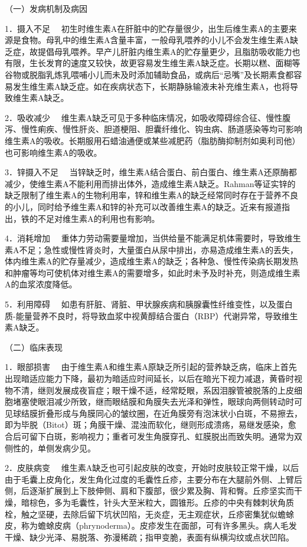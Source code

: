 （一）发病机制及病因

{1．摄入不足}
　初生时维生素A在肝脏中的贮存量很少，出生后维生素A的主要来源是食物。母乳中的维生素A含量丰富，一般母乳喂养的小儿不会发生维生素A缺乏症，故提倡母乳喂养。早产儿肝脏内维生素A的贮存量更少，且脂肪吸收能力也有限，生长发育的速度又较快，故更容易发生维生素A缺乏症。长期以糕、面糊等谷物或脱脂乳炼乳喂哺小儿而未及时添加辅助食品，或病后“忌嘴”及长期素食都容易发生维生素A缺乏症。如在疾病状态下，长期静脉输液未补充维生素A，也将导致维生素A缺乏。

{2．吸收减少}
　维生素A缺乏可见于多种临床情况，如吸收障碍综合征、慢性腹泻、慢性痢疾、慢性肝炎、胆道梗阻、胆囊纤维化、钩虫病、肠道感染等均可影响维生素A的吸收。长期服用石蜡油通便或某些减肥药（脂肪酶抑制剂如奥利司他）也可影响维生素A的吸收。

{3．锌摄入不足}
　当锌缺乏时，维生素A结合蛋白、前白蛋白、维生素A还原酶都减少，使维生素A不能利用而排出体外，造成维生素A缺乏。Rahman等证实锌的缺乏限制了维生素A的生物利用率，锌和维生素A的缺乏经常同时存在于营养不良的小儿，同时给予维生素A和锌的补充可以改善维生素A的缺乏。近来有报道指出，铁的不足对维生素A的利用也有影响。

{4．消耗增加}
　重体力劳动需要量增加，当供给量不能满足机体需要时，导致维生素A不足；急性或慢性肾炎时，大量蛋白从尿中排出，亦易造成维生素A的丢失，体内维生素A的贮存量减少，造成维生素A的缺乏；各种急、慢性传染病长期发热和肿瘤等均可使机体对维生素A的需要增多，如此时未予及时补充，则造成维生素A的血浆浓度降低。

{5．利用障碍}
　如患有肝脏、肾脏、甲状腺疾病和胰腺囊性纤维变性，以及蛋白质-能量营养不良时，将导致血浆中视黄醇结合蛋白（RBP）代谢异常，导致维生素A缺乏。

（二）临床表现

{1．眼部损害}
　由于维生素A和维生素A原缺乏所引起的营养缺乏病，临床上首先出现暗适应能力下降，最初为暗适应时间延长，以后在暗光下视力减退，黄昏时视物不清，继则发展成夜盲症；眼干燥不适，经常眨眼，系因泪腺管被脱落的上皮细胞堵塞使眼泪减少所致，继而眼结膜和角膜失去光泽和弹性，眼球向两侧转动时可见球结膜折叠形成与角膜同心的皱纹圈，在近角膜旁有泡沫状小白斑，不易擦去，即为毕脱（Bitot）斑；角膜干燥、混浊而软化，继则形成溃疡，易继发感染，愈合后可留下白斑，影响视力；重者可发生角膜穿孔、虹膜脱出而致失明。通常为双侧性的，单侧发病少见。

{2．皮肤病变}
　维生素A缺乏也可引起皮肤的改变，开始时皮肤较正常干燥，以后由于毛囊上皮角化，发生角化过度的毛囊性丘疹，主要分布在大腿前外侧、上臂后侧，后逐渐扩展到上下肢伸侧、肩和下腹部，很少累及胸、背和臀。丘疹坚实而干燥，暗棕色，多为毛囊性，针头大至米粒大，圆锥形。丘疹的中央有棘刺状角质栓，触之坚硬，去除后留下坑状凹陷，无炎症，无主观症状，丘疹密集犹似蟾蜍皮，称为蟾蜍皮病（phrynoderma）。皮疹发生在面部，可有许多黑头。病人毛发干燥、缺少光泽、易脱落、弥漫稀疏；指甲变脆，表面有纵横沟纹或点状凹陷。

